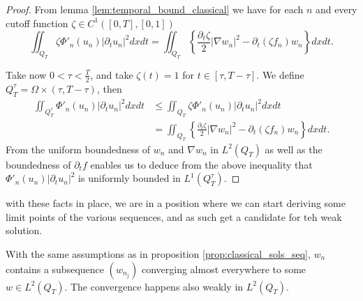 \documentclass[11pt, a4paper]{article}
\begin{document}
\begin{proof}
From lemma \ref{lem:temporal_bound_classical} we have for each $n$ and every cutoff function $\zeta\in C^1([0,T], [0,1])$
	\begin{equation}
	\iint_{Q_T} \zeta \Phi'_n(u_n) |\partial_t u_n|^2 dxdt = \iint_{Q_T} \left\{ \frac{\partial_t \zeta}{2}|\nabla w_n|^2 - \partial_t(\zeta f_n) w_n \right\} dxdt.
	\end{equation}
	
	Take now $0<\tau < \frac{T}{2}$, and take $\zeta(t)=1$ for $t\in [\tau, T-\tau]$. We define $Q_T^\tau = \Omega \times (\tau, T - \tau)$, then
	\begin{align*}
	\iint_{Q_T^\tau}\Phi'_n(u_n)|\partial_t u_n|^2 dxdt & \leq \iint_{Q_T}\zeta\Phi'_n(u_n)|\partial_t u_n|^2 dxdt \\
	&= \iint_{Q_T} \left\{ \frac{\partial_t \zeta}{2}|\nabla w_n|^2 - \partial_t(\zeta f_n) w_n \right\} dxdt.
	\end{align*}
	From the uniform boundedness of $w_n$ and $\nabla w_n$ in $L^2(Q_T)$ as well as the boundedness of $\partial_t f$ enables us to deduce from the above inequality that $\Phi'_n(u_n)|\partial_t u_n|^2$ is uniformly bounded in $L^1(Q_T^\tau)$.
\end{proof}

with these facts in place, we are in a position where we can start deriving some limit points of the various sequences, and as such get a candidate for teh weak solution.

\begin{proposition}
\label{prop:weak_convergence_w_n}
With the same assumptions as in proposition \ref{prop:classical_sols_seq},
$w_n$ contains a subsequence $(w_{n_j})$ converging almost everywhere to some $w \in L^2(Q_T)$. The convergence happens also weakly in $L^2(Q_T)$.
\end{proposition}
\end{document}
